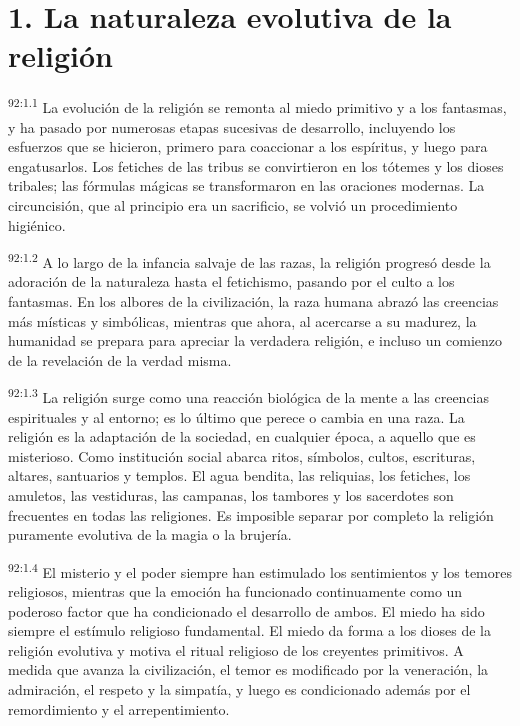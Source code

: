 \documentclass[twoside, 11pt]{book}
\begin{document}
\section*{1. La naturaleza evolutiva de la religión}
\par
\textsuperscript{92:1.1} La evolución de la religión se remonta al miedo primitivo y a los fantasmas, y ha pasado por numerosas etapas sucesivas de desarrollo, incluyendo los esfuerzos que se hicieron, primero para coaccionar a los espíritus, y luego para engatusarlos. Los fetiches de las tribus se convirtieron en los tótemes y los dioses tribales; las fórmulas mágicas se transformaron en las oraciones modernas. La circuncisión, que al principio era un sacrificio, se volvió un procedimiento higiénico.

\par
\textsuperscript{92:1.2} A lo largo de la infancia salvaje de las razas, la religión progresó desde la adoración de la naturaleza hasta el fetichismo, pasando por el culto a los fantasmas. En los albores de la civilización, la raza humana abrazó las creencias más místicas y simbólicas, mientras que ahora, al acercarse a su madurez, la humanidad se prepara para apreciar la verdadera religión, e incluso un comienzo de la revelación de la verdad misma.

\par
\textsuperscript{92:1.3} La religión surge como una reacción biológica de la mente a las creencias espirituales y al entorno; es lo último que perece o cambia en una raza. La religión es la adaptación de la sociedad, en cualquier época, a aquello que es misterioso. Como institución social abarca ritos, símbolos, cultos, escrituras, altares, santuarios y templos. El agua bendita, las reliquias, los fetiches, los amuletos, las vestiduras, las campanas, los tambores y los sacerdotes son frecuentes en todas las religiones. Es imposible separar por completo la religión puramente evolutiva de la magia o la brujería.

\par
\textsuperscript{92:1.4} El misterio y el poder siempre han estimulado los sentimientos y los temores religiosos, mientras que la emoción ha funcionado continuamente como un poderoso factor que ha condicionado el desarrollo de ambos. El miedo ha sido siempre el estímulo religioso fundamental. El miedo da forma a los dioses de la religión evolutiva y motiva el ritual religioso de los creyentes primitivos. A medida que avanza la civilización, el temor es modificado por la veneración, la admiración, el respeto y la simpatía, y luego es condicionado además por el remordimiento y el arrepentimiento.
\end{document}

